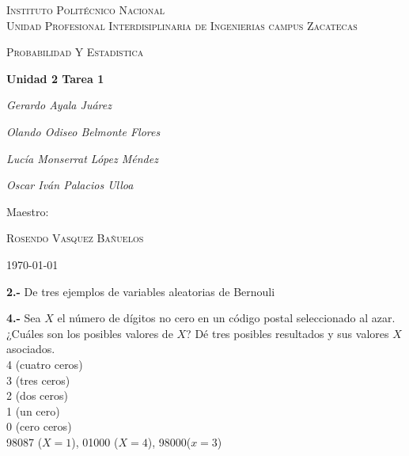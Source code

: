 \documentclass[12pt, letterpaper, spanish]{article}
\begin{document}
\begin{titlepage}
	\centering
	{\scshape\LARGE Instituto Politécnico Nacional\\ Unidad Profesional Interdisiplinaria de Ingenierias campus Zacatecas\par}
	\vspace{1cm}
	{\scshape\Large Probabilidad Y Estadistica\par}
	\vspace{1.5cm}
	{\huge\bfseries Unidad 2 Tarea 1\par}
	\vspace{2cm}
	{\Large\itshape Gerardo Ayala Juárez\par}
	{\Large\itshape Olando Odiseo Belmonte Flores\par}
	{\Large\itshape Lucía Monserrat López Méndez\par}
	{\Large\itshape Oscar Iván Palacios Ulloa\par}
	\vfill
	Maestro:\par
	\textsc{
	Rosendo Vasquez Bañuelos}
	\vfill
	{\large \today \par}
\end{titlepage}
\textbf{2.-} De tres ejemplos de variables aleatorias de Bernouli\vskip0.5cm

\textbf{4.-} Sea $X$ el número de dígitos no cero en un código postal seleccionado al azar. ¿Cuáles  son los posibles valores de $X$? Dé tres posibles resultados y sus valores $X$ asociados.\\
4 (cuatro ceros)\\
3 (tres ceros)\\
2 (dos ceros)\\
1 (un cero)\\
0 (cero ceros)\\
98087 ($X=1$), 01000 ($X=4$), 98000($x=3$) \vskip0.5cm
\end{document}
